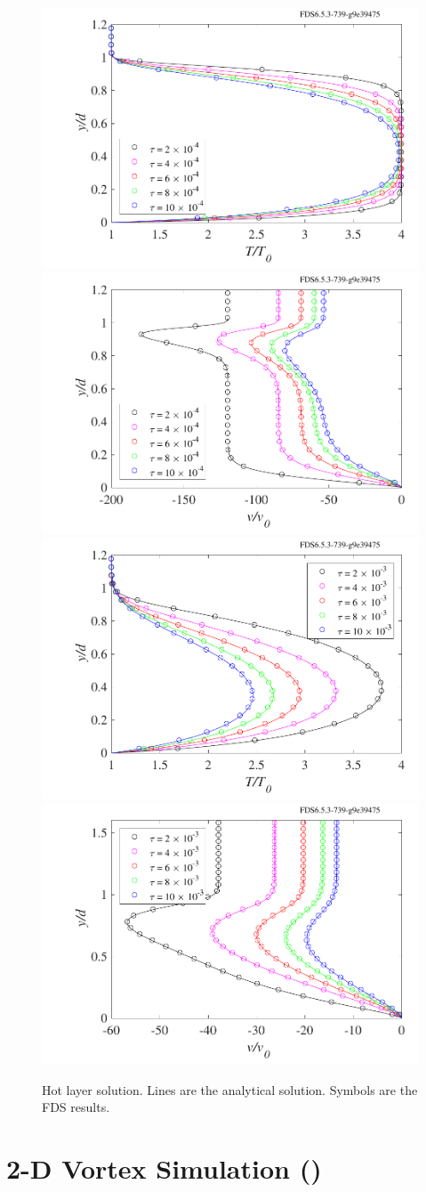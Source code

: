 \documentclass[11pt]{book}
\begin{document}
\begin{figure}[ht]
\centering
\includegraphics[width=.49\textwidth]{SCRIPT_FIGURES/hot_layer_temp_1}
\includegraphics[width=.49\textwidth]{SCRIPT_FIGURES/hot_layer_vel_1}
\includegraphics[width=.49\textwidth]{SCRIPT_FIGURES/hot_layer_temp_2}
\includegraphics[width=.49\textwidth]{SCRIPT_FIGURES/hot_layer_vel_2}
\caption[The {\ct hot\_layer\_collapse} test case]{Hot layer solution. Lines are the analytical solution.  Symbols are the FDS results.}
\label{fig_hot_layer}
\end{figure}




\section{2-D Vortex Simulation (\texorpdfstring{}{vort2d})}
\label{two_dimensional_vortex}
\end{document}
